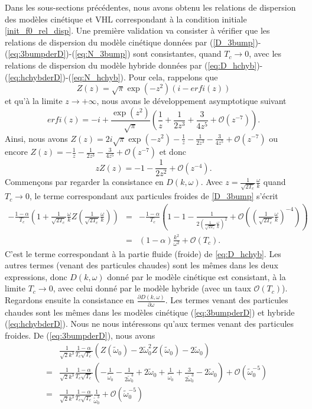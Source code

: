Dans les sous-sections précédentes, nous avons obtenu les relations de dispersion des modèles cinétique et VHL correspondant à la condition initiale \eqref{init_f0_rel_disp}. Une première validation va consister à vérifier que les relations de dispersion du modèle cinétique données par (\ref{D_3bump})-(\ref{eq:3bumpderD})-(\ref{eq:N_3bump}) sont consistantes, quand $T_c\to 0$, avec les relations de dispersion du modèle hybride données par (\ref{eq:D_hchyb})-(\ref{eq:hchybderD})-(\ref{eq:N_hchyb}). Pour cela, rappelons que 
$$
  Z(z)=\sqrt{\pi} \exp(-z^2) (i - erfi(z) )
$$
et qu'à la limite $z\to+\infty$, nous avons le développement asymptotique suivant 
$$
  erfi(z) = -i + \frac{\exp(z^2)}{\sqrt{\pi}} \left(\frac{1}{z} +\frac{1}{2z^3} +\frac{3}{4z^5} + \mathcal{O}\left(z^{-7}\right) \right).
$$
Ainsi, nous avons $Z(z) =  2 i \sqrt{\pi} \exp(-z^2)  - \frac{1}{z}  - \frac{1}{2z^3} - \frac{3}{4z^5}+ \mathcal{O}\left(z^{-7}\right)$ ou encore $Z(z)= - \frac{1}{z}  - \frac{1}{2z^3}- \frac{3}{4z^5}+ \mathcal{O}\left(z^{-7}\right)$ et donc
$$
  zZ(z)=-1-\frac{1}{2z^2} + \mathcal{O}\left(z^{-4}\right).
$$
Commençons par regarder la consistance en $D(k,\omega)$. Avec $z=\frac{1}{\sqrt{2T_c}}\frac{\omega}{k}$ quand $T_c\to 0$, le terme correspondant aux particules froides de \eqref{D_3bump} s'écrit
\begin{eqnarray*}
  -\frac{1-\alpha}{T_c}\left(1+\frac{1}{\sqrt{2T_c}}\frac{\omega}{k}Z\left(\frac{1}{\sqrt{2T_c}}\frac{\omega}{k}\right)\right)&=&-\frac{1-\alpha}{T_c}\left(1-1-\frac{1}{2\left(\frac{1}{\sqrt{2T_c}}\frac{\omega}{k}\right)^2}+ \mathcal{O}\left(\left(\frac{1}{\sqrt{2T_c}}\frac{\omega}{k}\right)^{-4}\right)\right)\nonumber\\
  &=& \left(1-\alpha\right)\frac{k^2}{\omega^2} + \mathcal{O}(T_c). 
\end{eqnarray*}
C'est le terme correspondant à la partie fluide (froide) de \eqref{eq:D_hchyb}. Les autres termes (venant des particules chaudes) sont les mêmes dans les deux expressions, donc $D(k,\omega)$ donné par le modèle cinétique est consistant, à la limite $T_c\to 0$, avec celui donné par le modèle hybride (avec un taux $\mathcal{O}(T_c)$). Regardons ensuite la consistance en $\frac{\partial D(k,\omega)}{\partial \omega}$. Les termes venant des particules chaudes sont les mêmes dans les modèles cinétique (\ref{eq:3bumpderD}) et hybride (\ref{eq:hchybderD}). Nous ne nous intéressons qu'aux termes venant des particules froides. De (\ref{eq:3bumpderD}), nous avons
\begin{eqnarray*}
  &&\frac{1}{\sqrt{2}k^3}\frac{1-\alpha}{T_c\sqrt{T_c}}\left(Z\left(\tilde{\omega}_0\right)-2\tilde{\omega}_0^2Z\left(\tilde{\omega}_0\right)-2\tilde{\omega}_0\right)\\
  &=&\frac{1}{\sqrt{2}k^3}\frac{1-\alpha}{T_c\sqrt{T_c}}\left(-\frac{1}{\tilde{\omega}_0}-\frac{1}{2\tilde{\omega}_0^3}+2\tilde{\omega}_0+\frac{1}{\tilde{\omega}_0}+\frac{3}{2\tilde{\omega}_0^3}-2\tilde{\omega}_0\right)+\mathcal{O}\left(\tilde{\omega}_0^{-5}\right)\\
  &=&\frac{1}{\sqrt{2}k^3}\frac{1-\alpha}{T_c\sqrt{T_c}}\frac{1}{\tilde{\omega}_0^3}+\mathcal{O}\left(\tilde{\omega}_0^{-5}\right)
\end{eqnarray*}

